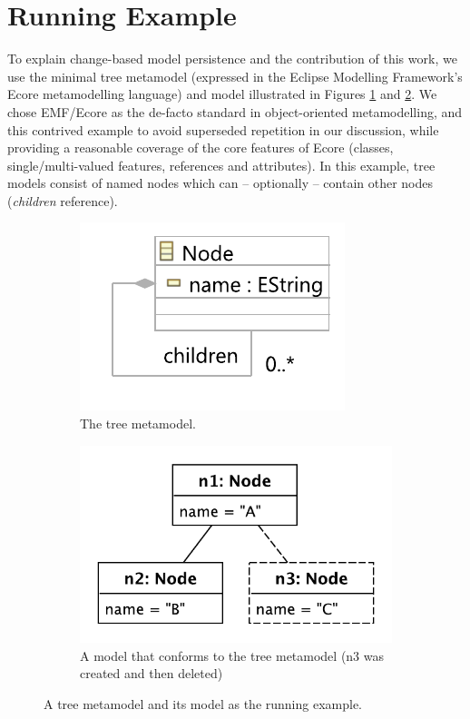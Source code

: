 \documentclass{llncs}
\begin{document}
\section{Running Example}
\label{sec:case_study}
To explain change-based model persistence and the contribution of this work, we use the minimal tree metamodel (expressed in the Eclipse Modelling Framework's Ecore metamodelling language) and model illustrated in Figures \ref{fig:tree_metamodel} and \ref{fig:initial_model}.
We chose EMF/Ecore as the de-facto standard in object-oriented metamodelling, and this contrived example to avoid superseded repetition in our discussion, while providing a reasonable coverage of the core features of Ecore (classes, single/multi-valued features, references and attributes).
In this example, tree models consist of named nodes which can -- optionally -- contain other nodes (\emph{children} reference).

\begin{figure}[ht]
    \begin{subfigure}[t]{0.4\linewidth}
        \centering
        \includegraphics[width=0.8\linewidth]{node_metamodel}
        \caption{The tree metamodel.}
        \label{fig:tree_metamodel}
    \end{subfigure}
    \hfill
    \begin{subfigure}[t]{0.6\linewidth}
        \centering
        \includegraphics[width=0.6\linewidth]{initial_chart}
        \caption{A model that conforms to the tree metamodel (n3 was created and then deleted)}
        \label{fig:initial_model}
    \end{subfigure}
    \caption{A tree metamodel and its model as the running example.}
    \label{fig:append_speed}
\end{figure}
\end{document}
